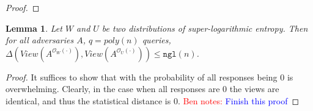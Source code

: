 \documentclass[11pt]{article}
\newcommand{\poly}{\ensuremath{\mathtt{poly}}\xspace}
\newcommand{\ngl}{\ensuremath{\mathtt{ngl}}\xspace}
\newcommand{\Hoo}{\mathrm{H}_\infty}
\newcommand{\Hav}{\tilde{\mathrm{H}}_\infty}
\newtheorem{lemma}[theorem]{Lemma}
\newcommand{\authnote}[2]{{\textcolor{red}{\textsf{#1 notes: }\textcolor{blue}{ #2}}\marginpar{\textcolor{red}{\textbf{!!!!!}}}}}
\newcommand{\authnote}[2]{}
\newcommand{\bnote}[1]{{\authnote{Ben}{#1}}}
\begin{document}
\begin{proof}
\end{proof}
\begin{lemma}
\label{lem:super log insist by equal queries}
Let $W$ and $U$ be two distributions of super-logarithmic entropy.  Then for all adversaries $A$, $q = poly(n)$ queries, $\Delta(View(A^{\mathcal{O}_W(\cdot)}), View(A^{\mathcal{O}_U(\cdot)}))\leq \ngl(n)$.
\end{lemma}
\begin{proof}
It suffices to show that with the probability of all responses being $0$ is overwhelming.  Clearly, in the case when all responses are $0$ the views are identical, and thus the statistical distance is $0$.  \bnote{Finish this proof}
\end{proof}
\end{document}
